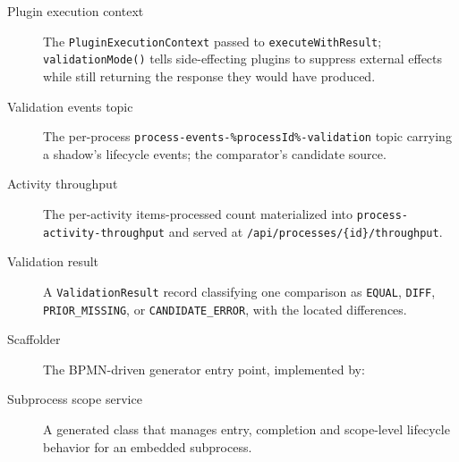 \begin{description}
\item[Plugin execution context] The \texttt{PluginExecutionContext} passed to \texttt{executeWithResult}; \texttt{validationMode()} tells side-effecting plugins to suppress external effects while still returning the response they would have produced.
\item[Validation events topic] The per-process \texttt{process-events-\%processId\%-validation} topic carrying a shadow's lifecycle events; the comparator's candidate source.
\item[Activity throughput] The per-activity items-processed count materialized into \texttt{process-activity-throughput} and served at \texttt{/api/processes/\{id\}/throughput}.
\item[Validation result] A \texttt{ValidationResult} record classifying one comparison as \texttt{EQUAL}, \texttt{DIFF}, \\ \texttt{PRIOR\_MISSING}, or \texttt{CANDIDATE\_ERROR}, with the located differences.
\item[Scaffolder] The BPMN-driven generator entry point, implemented by:
\begin{quote}
\end{quote}
\item[Subprocess scope service] A generated class that manages entry, completion and scope-level lifecycle behavior for an embedded subprocess.
\end{description}
